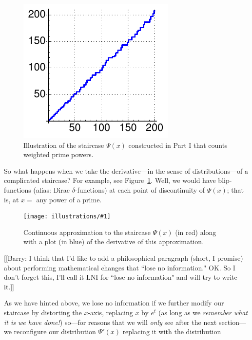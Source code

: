 \documentclass[11pt]{article}
\newcommand{\ill}[3]{ 
   \begin{figure}[H]
   \begin{center}
   \texttt{[image: illustrations/\#1]}
   \caption{#3}
   \end{center}
    \end{figure}
}
\theoremstyle{plain}
\theoremstyle{definition}
\numberwithin{equation}{section}
\numberwithin{figure}{section}
\numberwithin{table}{section}
\begin{document}
\begin{figure}[H]
\begin{center}
\includegraphics[width=0.7\textwidth]{illustrations/psi_200}
\caption{Illustration of the  staircase $\Psi(x)$  constructed in Part I that 
counts weighted prime powers.\label{fig:psi_200}}
\end{center}
\end{figure}
  
So what happens when we take the derivative---in the sense of
distributions---of a complicated staircase?  For example, see
Figure~\ref{fig:psi_200}.  Well, we would have blip-functions (alias:
Dirac $\delta$-functions) at each point of discontinuity of $\Psi(x)$;
that is, at $x=$ any power of a prime.
  
     \bigskip
   
     \ill{psi_prime}{.7}{Continuous approximation to the staircase
       $\Psi(x)$ (in red) along with a plot (in blue) of the
       derivative of this approximation.}
      
\bigskip

[[Barry: I think that I'd like to add a philosophical paragraph
(short, I promise) about performing mathematical changes that ``lose
no information."  OK. So I don't forget this, I'll call it LNI for
``lose no information" and will try to write it.]]
  
As we have hinted above, we lose no information if we further modify
our staircase by distorting the $x$-axis, replacing $x$ by $e^t$ (as
long as we {\em remember what it is we have done!})  so---for reasons
that we will {\em only} see after the next section---we reconfigure
our distribution $\Psi'(x)$ replacing it with the distribution
\end{document}
